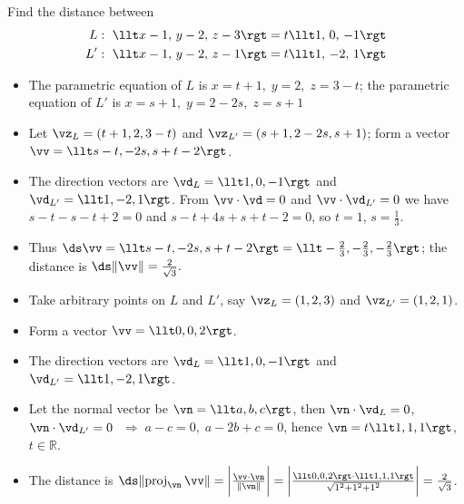 \begin{eg}\label{eg:VPdistance-line-line}
Find the distance between
\begin{align*}
L&:\  \llt x-1,\,y-2,\,z-3\rgt = t \llt 1,\,0,\,-1 \rgt \\
L'&:\ \llt x-1,\,y-2,\,z-1\rgt = t \llt 1,\,-2,\,1 \rgt
\end{align*}
\soln
\begin{itemize}
\item The parametric equation of $L$ is $x = t + 1,\;y = 2,\;z = 3 - t$; the parametric equation of $L'$ is $x = s + 1,\;y = 2 - 2s,\;z = s + 1$
\item Let $\vz_L = (t + 1, 2, 3 - t)$ and $\vz_{L'} = (s + 1, 2 - 2s, s + 1)$; form a vector $\vv = \llt s - t, -2s, s + t - 2\rgt$.
\item The direction vectors are $\vd_L = \llt1, 0, -1\rgt$ and $\vd_{L'} = \llt1, -2, 1\rgt$. From $\vv\cdot\vd = 0$ and $\vv\cdot\vd_{L'} = 0$ we have $s - t - s - t + 2 = 0$ and $s - t + 4s + s + t - 2 = 0$, so $t = 1$, $s = \frac{1}{3}$.
\item Thus $\ds\vv = \llt s - t, -2s, s + t - 2\rgt = \llt -\frac{2}{3}, -\frac{2}{3}, -\frac{2}{3}\rgt$; the distance is $\ds\|\vv\| = \frac{2}{\sqrt{3}}.$
\end{itemize}
\soln
\begin{itemize}
\item Take arbitrary points on $L$ and $L'$, say $\vz_L = (1, 2, 3)$ and $\vz_{L'} = (1, 2, 1)$.
\item Form a vector $\vv = \llt0, 0, 2\rgt$.
\item The direction vectors are $\vd_L = \llt1, 0, -1\rgt$ and $\vd_{L'} = \llt1, -2, 1\rgt$.
\item Let the normal vector be $\vn = \llt a, b, c\rgt$, then $\vn\cdot\vd_L = 0$, $\vn\cdot\vd_{L'} = 0$ $\;\Longrightarrow\;a-c = 0,\;a - 2b + c = 0$, hence $\vn = t\llt1, 1, 1\rgt$, $t\in\mathbb{R}$.
\item The distance is $\ds\|{\rm proj}_{\vn}\,\vv\| = \bigg|\frac{\vv\cdot\vn}{\|\vn\|}\bigg| = \bigg|\frac{\llt0,0,2\rgt\cdot\llt1,1,1\rgt}{\sqrt{1^2+1^2+1^2}}\bigg| = \frac{2}{\sqrt{3}}$.
\end{itemize}

\end{eg}
